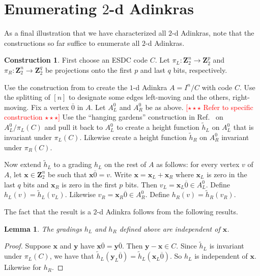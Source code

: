 \documentclass[12pt,twoside,singlespace]{article}
\numberwithin{equation}{section}
\newtheorem{lem}[equation]{Lemma}
\theoremstyle{definition}
\newtheorem{construction}[equation]{Construction}
\newcommand{\ZZ}{\mathbf{Z}}
\newcommand{\com}[1]{\textcolor{red}{$[\star \star \star$ #1 $\star \star \star]$}}
\renewcommand{\vec}[1]{\mathbf{#1}}
\begin{document}
\section{Enumerating $2$-d Adinkras}
As a final illustration that we have characterized all $2$-d Adinkras, note that the constructions so far suffice to enumerate all $2$-d Adinkras.

\begin{construction}
First choose an ESDC code $C$.  Let $\pi_L:\ZZ_2^n\to\ZZ_2^p$ and $\pi_R:\ZZ_2^n\to\ZZ_2^q$ be projections onto the first $p$ and last $q$ bits, respectively.

Use the construction from \cite{d2l:omni,d2l:topology} to create the $1$-d Adinkra $A=I^n/C$ with code $C$.  Use the splitting of $[n]$ to designate some edges left-moving and the others, right-moving.  Fix a vertex $\overline{0}$ in $A$.  Let $A_L^0$ and $A_R^0$ be as above. \com{Refer to specific construction}  Use the ``hanging gardens'' construction in Ref.~\cite{d2l:graph-theoretic} on $A_L^0/\pi_L(C)$ and pull it back to $A_L^0$ to create a height function $\tilde{h}_L$ on $A_L^0$ that is invariant under $\pi_L(C)$.  Likewise create a height function $\tilde{h}_R$ on $A_R^0$ invariant under $\pi_R(C)$.

Now extend $\tilde{h}_L$ to a grading $h_L$ on the rest of $A$ as follows: for every vertex $v$ of $A$, let $\vec{x}\in \ZZ_2^n$ be such that $\vec{x}\overline{0}=v$.  Write $\vec{x}=\vec{x}_L+\vec{x}_R$ where $\vec{x}_L$ is zero in the last $q$ bits and $\vec{x}_R$ is zero in the first $p$ bits.  Then $v_L=\vec{x}_L\overline{0}\in A_L^0$.  Define $h_L(v)=\tilde{h}_L(v_L)$.  Likewise $v_R=\vec{x}_R\overline{0}\in A_R^0$.  Define $h_R(v)=\tilde{h}_R(v_R)$.
\end{construction}

The fact that the result is a $2$-d Adinkra follows from the following results.

\begin{lem}
The gradings $h_L$ and $h_R$ defined above are independent of $\vec{x}$.\label{lem:indep}
\end{lem}

\begin{proof}
Suppose $\vec{x}$ and $\vec{y}$ have $\vec{x}\overline{0}=\vec{y}\overline{0}$.  Then $\vec{y}-\vec{x}\in C$.  Since $\tilde{h}_L$ is invariant under $\pi_L(C)$, we have that $\tilde{h}_L(\vec{y}_L\overline{0})=\tilde{h}_L(\vec{x}_L\overline{0})$.  So $h_L$ is independent of $\vec{x}$.  Likewise for $h_R$.
\end{proof}
\end{document}
